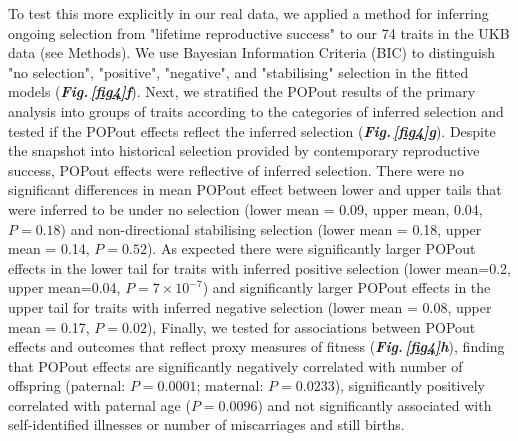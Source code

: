 \documentclass[12pt]{zHenriquesLab-StyleBioRxiv}
\newcommand\dref[2]{\normalsize{\textbf{\textit{Fig.\,\ref{#1}#2}}}\normalsize{}}
\begin{document}
\FloatBarrier
To test this more explicitly in our real data, we applied a 
method \cite{Sanjak2018} for inferring ongoing selection from 
"lifetime reproductive success" to our 74 traits in the UKB 
data (see Methods). We use Bayesian Information Criteria (BIC) 
to distinguish "no selection", "positive", "negative", and 
"stabilising" selection in the fitted models (\dref{fig4}{f}). 
Next, we stratified the POPout results of the primary analysis into 
groups of traits according to the categories of inferred selection and tested if 
the POPout effects reflect the inferred selection (\dref{fig4}{g}). 
Despite the snapshot into historical selection provided by 
contemporary reproductive success, POPout effects were reflective 
of inferred selection. There were no significant differences in 
mean POPout effect between lower and upper tails that were inferred to 
be under no selection (lower mean = 0.09, upper mean, 0.04, $P=0.18$) 
and non-directional stabilising selection (lower mean = 0.18, upper mean = 0.14, $P=0.52$). 
As expected there were significantly larger POPout effects in the lower tail 
for traits with inferred positive selection (lower mean=0.2, upper mean=0.04, $P=7 \times 10^{-7}$) 
and significantly larger POPout effects in the upper 
tail for traits with inferred negative selection (lower mean = 0.08, upper mean = 0.17, $P=0.02$), 
Finally, we tested for associations between POPout effects and outcomes that reflect proxy 
measures of fitness (\dref{fig4}{h}), finding that POPout effects are significantly negatively correlated with number of 
offspring (paternal: $P=0.0001$; maternal: $P=0.0233$), significantly positively correlated 
with paternal age ($P=0.0096$) and not significantly associated with self-identified illnesses 
or number of miscarriages and still births. 
% 
% 
% 
% 
% 
% 
% 
% 
% 
% 
% 
% 
% 
% 
% 
% 
% 
% 
% 
% 
% 
% 
% 
% 
% 
% 
% 
% 
% 
% 
% 
% 
% 
% 
% 
% 
% 
% 
% 
% 
% 
% 
% 
% 
% 
% 
% 
% 
% 
% 
\FloatBarrier
\end{document}
